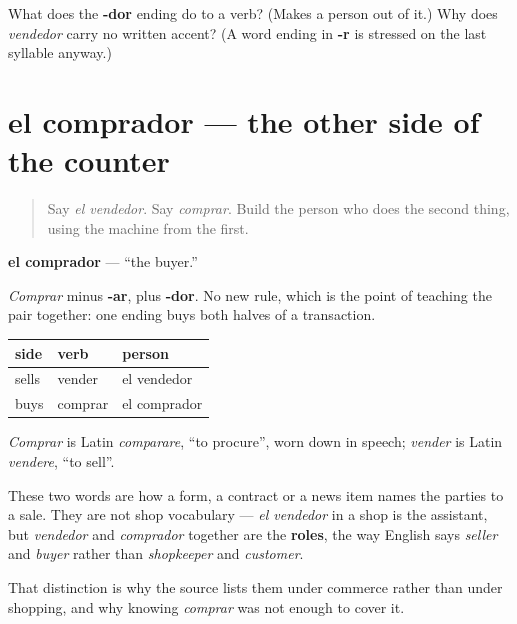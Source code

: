 \begin{tcolorbox}[breakable,colback=teal!4,colframe=teal!35!black,title={Before you move on}]
What does the \textbf{-dor} ending do to a verb? (Makes a person out of it.) Why does \emph{vendedor} carry no written accent? (A word ending in \textbf{-r} is stressed on the last syllable anyway.)
\end{tcolorbox}
\section[el comprador]{el comprador — the other side of the counter}

\label{lesson:ES-C427-comprador}



\begin{quote}
Say \emph{el vendedor}. Say \emph{comprar}. Build the person who does the second thing, using the machine from the first.
\end{quote}

\begin{cousinweb}
\textbf{el comprador} — \textquotedblleft{}the buyer.\textquotedblright{}

\emph{Comprar} minus \textbf{-ar}, plus \textbf{-dor}. No new rule, which is the point of teaching the pair together: one ending buys both halves of a transaction.

\noindent
\begin{tabularx}{\linewidth}{@{}>{\raggedright\arraybackslash}X>{\raggedright\arraybackslash}X>{\raggedright\arraybackslash}X@{}}
\toprule
\textbf{side} & \textbf{verb} & \textbf{person} \\
\midrule
sells & vender & el vendedor \\
buys & comprar & el comprador \\
\bottomrule
\end{tabularx}

\emph{Comprar} is Latin \emph{comparare}, \textquotedblleft{}to procure\textquotedblright{}, worn down in speech; \emph{vender} is Latin \emph{vendere}, \textquotedblleft{}to sell\textquotedblright{}.
\end{cousinweb}

\begin{grammarlens}[title={Grammar Lens: the pair that names an economy}]
These two words are how a form, a contract or a news item names the parties to a sale. They are not shop vocabulary — \emph{el vendedor} in a shop is the assistant, but \emph{vendedor} and \emph{comprador} together are the \textbf{roles}, the way English says \emph{seller} and \emph{buyer} rather than \emph{shopkeeper} and \emph{customer}.

That distinction is why the source lists them under commerce rather than under shopping, and why knowing \emph{comprar} was not enough to cover it.
\end{grammarlens}

